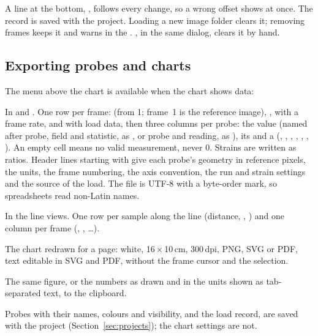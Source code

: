 A line at the bottom, , follows every change, so a wrong offset
shows at once. The record is saved with the project. Loading a new image folder clears it; removing
frames keeps it and warns in the . , in the same dialog, clears it by
hand.

\subsection{Exporting probes and charts}

The  menu above the chart is available when the chart shows data:

\begin{description}[leftmargin=0.6cm,style=nextline]
  \item[Probe data (CSV)…]
    In  and . One row per frame:  (from 1; frame~1 is the reference
    image), ,  with a frame rate,  and 
    with load data, then three columns per probe: the value (named after probe, field and
    statistic, as , or probe and reading, as ), its
     and a  (, ,
    , , , ,
    ). An empty cell means no valid measurement, never 0. Strains are written as
    ratios. Header lines starting with \file{\#} give each probe's geometry in reference pixels, the
    units, the frame numbering, the axis convention, the run and strain settings and the source of
    the load. The file is UTF-8 with a byte-order mark, so spreadsheets read non-Latin names.
  \item[Line data (CSV)…]
    In the line views. One row per sample along the line (distance, , ) and
    one column per frame (, , \ldots).
  \item[Chart image…]
    The chart redrawn for a page: white, 16\,$\times$\,10\,cm, 300\,dpi, PNG, SVG or PDF, text
    editable in SVG and PDF, without the frame cursor and the selection.
  \item[Copy chart, Copy plotted data]
    The same figure, or the numbers as drawn and in the units shown as tab-separated text, to the
    clipboard.
\end{description}

Probes with their names, colours and visibility, and the load record, are saved with the project
(Section~\ref{sec:projects}); the chart settings are not.

